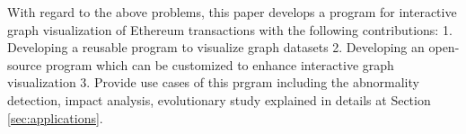 With regard to the above problems, this paper develops a program for interactive graph visualization of Ethereum transactions with the following contributions:
1. Developing a reusable program to visualize graph datasets
2. Developing an open-source program which can be customized to enhance interactive graph visualization
3. Provide use cases of this prgram including the abnormality detection, impact analysis, evolutionary study explained in details at Section \ref{sec:applications}.